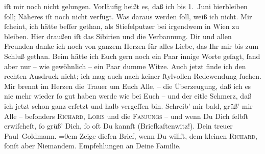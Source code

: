 \begin{ledgroupsized}[t]{13cm}
               iſt mir noch nicht gelungen. Vorläufig heißt es, daß ich bis 1. Juni hierbleiben ſoll; Näheres iſt noch nicht verfügt. Was daraus
               werden ſoll, weiß ich nicht. Mir ſcheint, ich hätte beſſer gethan, als {\pb}Stiefelputzer bei irgendwem in Wien zu bleiben. Hier draußen iſt das Sibirien und die Verbannung.\pend
           \pstart
           Dir und allen Freunden danke ich noch von ganzem Herzen für alles Liebe, das Ihr  mir bis zum Schluß gethan. Beim \label{K_L02660-2v}\label{K_L02660-2h} hätte ich
               Euch gern noch ein Paar innige Worte geſagt, ſand aber nur – wie gewöhnlich – ein
               Paar dumme Witze. Auch jetzt finde ich den rechten Ausdruck nicht; ich mag auch nach
               keiner ſtylvollen Redewendung ſuchen. Mir brennt im Herzen die Trauer um Euch Alle, –
               die Überzeugung, daß ich es nie mehr wieder ſo gut haben werde wie bei Euch – und der
               eitle Schmerz, daß ich jetzt schon ganz erſetzt und halb vergeſſen bin.\pend
           \pstart
           Schreib’ mir bald, grüß’ mir Alle – beſonders \textsc{Richard}, \textsc{Loris} und die \textsc{Fanjungs} – und wenn Du Dich {\pb}ſelbſt erwiſcheſt, ſo
               grüß’ Dich, ſo oft Du kannſt (Briefkaſtenwitz!).\pend
           \pstart
           Dein treuer {\\[\baselineskip]}\spacefill\mbox{Paul Goldmann.}\pend
           \leftskip=0em{}\pstart
           \noindent{}Zeige dieſen Brief, wenn Du willſt, dem kleinen \textsc{Richard}, ſonſt aber Niemandem.\pend
           \pstart
           Empfehlungen an Deine Familie.\pend
           
         
         \endnumbering{}\end{ledgroupsized}  \newcommand{\dateiname}{L02660}\newcommand{\titel}{Paul Goldmann an Arthur Schnitzler, 6. 4. 1891}\newcommand{\editorInnen}{Martin Anton Müller und Laura Untner}
      